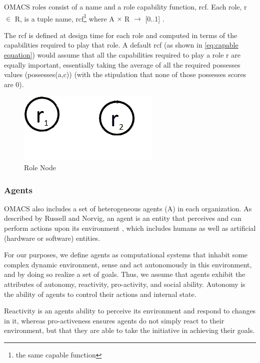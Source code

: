 OMACS roles consist of a name and a role capability function, rcf. Each role, r $\in$ R, is a tuple
\textlangle{} name, rcf\footnote{the same capable function} \textrangle{}  where A $\times$ R $\rightarrow$ {[}0..1{]} .


The rcf is defined at design time for each role and computed in terms of 
the capabilities required to play that role.
A default rcf (as shown in \ref{eq:capable equation}) 
would assume that all the capabilities required to play a role r are equally important,
essentially taking the average of all the required possesses values (possesses(a,c))
(with the stipulation that none of those possesses scores are 0). \cite{omacs4}
\hspace{1.5cm}
\begin{figure}[th]
	\centering
		\includegraphics[scale=0.5]{chapiter1/img/roles}
	\caption{\label{fig:Role Node}Role Node }
\end{figure}
\hspace{1cm}
\subsubsection{ Agents}

OMACS also includes a set of heterogeneous agents (A) in each organization. 
As described by Russell and Norvig, an agent is an entity that perceives and can perform actions upon its
environment  , which includes humans as well as artificial (hardware or software) entities. \cite{omacs2}

For our purposes, we define agents as computational systems that inhabit some complex dynamic
environment, sense and act autonomously in this environment, and by doing so realize a set of
goals. Thus, we assume that agents exhibit the attributes of autonomy, reactivity, pro-activity, and
social ability. Autonomy is the ability of agents to control their actions and internal state.


Reactivity is an agents ability to perceive its environment and respond to changes in it, whereas
pro-activeness ensures agents do not simply react to their environment, but that they are able to
take the initiative in achieving their goals. 

